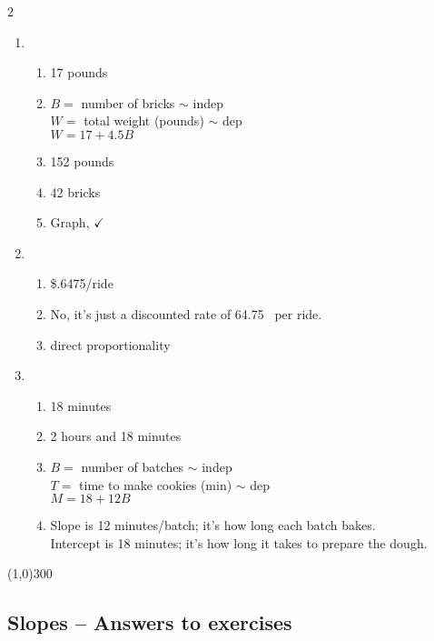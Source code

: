 \begin{multicols} {2}
\begin{enumerate}
\item %
\begin{enumerate}
\item 17 pounds 
\item $B=$ number of bricks $\sim$ indep \\ $W=$ total weight (pounds) $\sim$ dep \\ $W=17 + 4.5B$
\item 152 pounds
\item 42 bricks
\item Graph, $\checkmark$
\end{enumerate}

\item %
\begin{enumerate}
\item \$.6475/ride
\item No, it's just a discounted rate of 64.75\textcent~ per ride.
\item direct proportionality
\end{enumerate}

\item %
\begin{enumerate}
\item 18 minutes
\item 2 hours and 18 minutes
\item $B=$ number of batches $\sim$ indep \\ $T=$ time to make cookies (min) $\sim$ dep \\ $M = 18 + 12B$
\item Slope is 12 minutes/batch; it's how long each batch bakes. \\ Intercept is 18 minutes; it's how long it takes to prepare the dough.
\end{enumerate}

\end{enumerate}
\end{multicols}

\begin{center}
\line(1,0){300} %
\end{center}

\subsection {Slopes -- Answers to exercises} %

